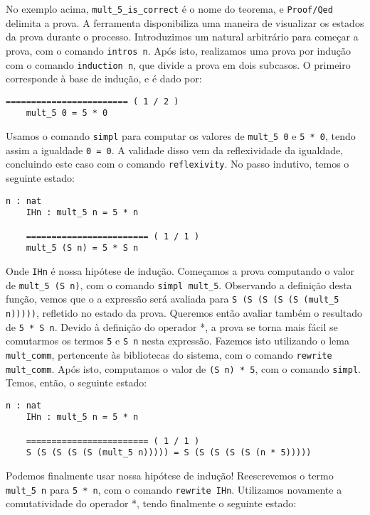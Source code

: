 No exemplo acima, \texttt{mult\_5\_is\_correct} é o nome do teorema, e
\texttt{Proof/Qed} delimita a prova.  A ferramenta disponibiliza uma maneira de
visualizar os estados da prova durante o processo. Introduzimos um natural
arbitrário para começar a prova, com o comando \texttt{intros n}. Após isto,
realizamos uma prova por indução com o comando \texttt{induction n}, que divide
a prova em dois subcasos. O primeiro corresponde à base de indução, e é dado
por:

\begin{lstlisting}[basicstyle=\small]
    ======================== ( 1 / 2 )
    mult_5 0 = 5 * 0

\end{lstlisting}

Usamos o comando \texttt{simpl} para computar os valores de \texttt{mult\_5 0} e
\texttt{5 * 0}, tendo assim a igualdade \texttt{0 = 0}. A validade disso vem da
reflexividade da igualdade, concluindo este caso com o comando
\texttt{reflexivity}. No passo indutivo, temos o seguinte estado:


\begin{lstlisting}[basicstyle=\small]
    n : nat
    IHn : mult_5 n = 5 * n

    ======================== ( 1 / 1 )
    mult_5 (S n) = 5 * S n
\end{lstlisting}

Onde \texttt{IHn} é nossa hipótese de indução. Começamos a prova computando o
valor de \texttt{mult\_5 (S n)}, com o comando \texttt{simpl mult\_5}.
Observando a definição desta função, vemos que o a expressão será avaliada para
\texttt{S (S (S (S (S (mult\_5 n)))))}, refletido no estado da prova. Queremos
então avaliar também o resultado de \texttt{5 * S n}. Devido à definição do
operador *, a prova se torna mais fácil se comutarmos os termos \texttt{5} e
\texttt{S n} nesta expressão. Fazemos isto utilizando o lema
\texttt{mult\_comm}, pertencente às bibliotecas do sistema, com o comando
\texttt{rewrite mult\_comm}. Após isto, computamos o valor de \texttt{(S n) *
    5}, com o comando \texttt{simpl}. Temos, então, o seguinte estado:

\begin{lstlisting}[basicstyle=\small]
    n : nat
    IHn : mult_5 n = 5 * n

    ======================== ( 1 / 1 )
    S (S (S (S (S (mult_5 n))))) = S (S (S (S (S (n * 5)))))
\end{lstlisting}

Podemos finalmente usar nossa hipótese de indução! Reescrevemos o termo
\texttt{mult\_5 n} para \texttt{5 * n}, com o comando \texttt{rewrite IHn}.
Utilizamos novamente a comutatividade do operador *, tendo finalmente o seguinte
estado:

